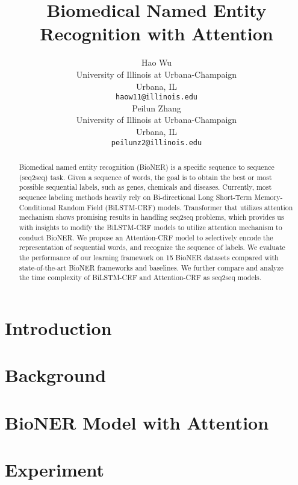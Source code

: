 \documentclass{article}
\title{Biomedical Named Entity Recognition with Attention}
\author{
  Hao Wu\\
  University of Illinois at Urbana-Champaign\\
  Urbana, IL \\
  \texttt{haow11@illinois.edu} \\
  \And
  Peilun Zhang \\
  University of Illinois at Urbana-Champaign\\
  Urbana, IL \\
  \texttt{peilunz2@illinois.edu} \\
}
\begin{document}
\maketitle

\begin{abstract}
Biomedical named entity recognition (BioNER) is a specific sequence to sequence (seq2seq) task. Given a sequence of words, the goal is to obtain the best or most possible sequential labels, such as genes, chemicals and diseases. Currently, most sequence labeling methods heavily rely on Bi-directional Long Short-Term Memory-Conditional Random Field (BiLSTM-CRF) models. Transformer that utilizes attention mechanism shows promising results in handling seq2seq problems, which provides us with insights to modify the BiLSTM-CRF models to utilize attention mechanism to conduct BioNER. We propose an Attention-CRF model to selectively encode the representation of sequential words, and recognize the sequence of labels. We evaluate the performance of our learning framework on 15 BioNER datasets compared with state-of-the-art BioNER frameworks and baselines. We further compare and analyze the time complexity of BiLSTM-CRF and Attention-CRF as seq2seq models.
\end{abstract}
\section{Introduction}

\section{Background}

\section{BioNER Model with Attention}
\section{Experiment}




\end{document}

